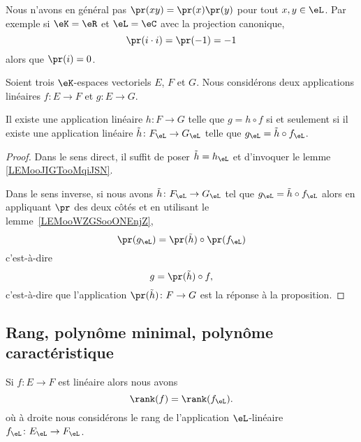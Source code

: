 \begin{remark}
	Nous n'avons en général pas \( \pr(xy)=\pr(x)\pr(y)\) pour tout \( x,y\in \eL\). Par exemple si \( \eK=\eR\) et \( \eL=\eC\) avec la projection canonique,
	\begin{equation}
		\pr(i\cdot i)=\pr(-1)=-1
	\end{equation}
	alors que \( \pr(i)=0\).
\end{remark}

\begin{proposition}     \label{PROPooHJJCooTXlzdH}
	Soient trois \( \eK\)-espaces vectoriels \( E\), \( F\) et \( G\). Nous considérons deux applications linéaires \( f\colon E\to F\) et \( g\colon E\to G\).

	Il existe une application linéaire \( h\colon F\to G\) telle que \( g=h\circ f\) si et seulement si il existe une application linéaire \( \tilde h\colon F_{\eL}\to G_{\eL}\) telle que \(   g_{\eL}=\tilde h\circ f_{\eL}   \).
\end{proposition}

\begin{proof}
	Dans le sens direct, il suffit de poser \( \tilde h=h_{\eL}\) et d'invoquer le lemme \ref{LEMooJIGTooMqiJSN}.

	Dans le sens inverse, si nous avons \( \tilde h\colon F_{\eL}\to G_{\eL}\) tel que \(   g_{\eL}=\tilde h\circ f_{\eL}  \) alors en appliquant \( \pr\) des deux côtés et en utilisant le lemme~\ref{LEMooWZGSooONEnjZ},
	\begin{equation}
		\pr(g_{\eL})=\pr(\tilde h)\circ\pr(f_{\eL})
	\end{equation}
	c'est-à-dire
	\begin{equation}
		g=\pr(\tilde h)\circ f,
	\end{equation}
	c'est-à-dire que l'application \( \pr(\tilde h)\colon F\to G\) est la réponse à la proposition.
\end{proof}

\subsection{Rang, polynôme minimal, polynôme caractéristique}

\begin{proposition}     \label{PROPooJFQDooZSsxMf}
	Si \( f\colon E\to F\) est linéaire alors nous avons
	\begin{equation}
		\rank(f)=\rank(f_{\eL}).
	\end{equation}
	où à droite nous considérons le rang de l'application \( \eL\)-linéaire \( f_{\eL}\colon E_{\eL}\to F_{\eL}\).
\end{proposition}

